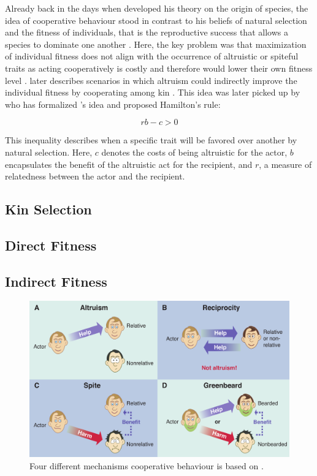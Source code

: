 \documentclass[sigconf]{acmart}
\begin{document}
    Already back in the days when \citeauthor{darwin_origin_1859} developed his theory on the origin of species, the idea of cooperative behaviour stood in contrast to his beliefs of natural selection and the fitness of individuals, that is the reproductive success that allows a species to dominate one another \cite{pennisi_how_2005}.
    Here, the key problem was that maximization of individual fitness does not align with the occurrence of altruistic or spiteful traits as acting cooperatively is costly and therefore would lower their own fitness level \cite{west_altruism_2010}.
    \citeauthor{darwin_origin_1859} later describes scenarios in which altruism could indirectly improve the individual fitness by cooperating among kin \cite{pennisi_how_2005}.
    This idea was later picked up by \citeauthor{hamilton_kin_1964} who has formalized \citeauthor{darwin_origin_1859}'s idea and proposed Hamilton's rule:

    $$rb-c>0$$

    This inequality describes when a specific trait will be favored over another by natural selection.
    Here, $c$ denotes the costs of being altruistic for the actor, $b$ encapsulates the benefit of the altruistic act for the recipient, and $r$, a measure of relatedness between the actor and the recipient.






    \cite{nowak_five_2006}

    \subsection{Kin Selection}\cite{west_altruism_2010}\cite{noauthor_pdf_nodate}

    \subsection{Direct Fitness}

    \subsection{Indirect Fitness}

    \begin{figure}
        \includegraphics[width=\columnwidth]{figures/mechanisms}
        \caption{Four different mechanisms cooperative behaviour is based on \cite{west_altruism_2010}.}
        \label{fig:mechanisms}
    \end{figure}
\end{document}
